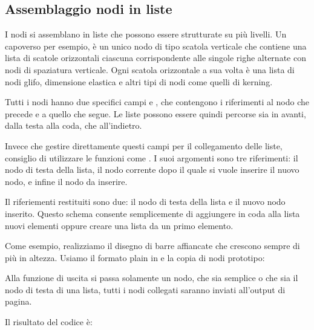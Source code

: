 \subsection{Assemblaggio nodi in liste}

I nodi si assemblano in liste che possono essere strutturate su più livelli. Un
capoverso per esempio, è un unico nodo di tipo scatola verticale che contiene
una lista di scatole orizzontali ciascuna corrispondente alle singole righe
alternate con nodi di spaziatura verticale. Ogni scatola orizzontale a sua volta
è una lista di nodi glifo, dimensione elastica e altri tipi di nodi come quelli
di kerning.

Tutti i nodi hanno due specifici campi  e , che contengono
i riferimenti al nodo che precede e a quello che segue. Le liste possono essere
quindi percorse sia in avanti, dalla testa alla coda, che all'indietro.

Invece che gestire direttamente questi campi per il collegamento delle liste,
consiglio di utilizzare le funzioni come
. I suoi argomenti sono tre
riferimenti: il nodo di testa della lista, il nodo corrente dopo il quale si
vuole inserire il nuovo nodo, e infine il nodo da inserire.

Il riferiementi restituiti sono due: il nodo di testa della lista e il nuovo
nodo inserito. Questo schema consente semplicemente di aggiungere in coda alla
lista nuovi elementi oppure creare una lista da un primo elemento.

Come esempio, realizziamo il disegno di barre affiancate che crescono sempre di
più in altezza. Usiamo il formato plain in \LuaTeX{} e la copia di nodi
prototipo:

Alla funzione di uscita  si passa solamente un nodo, che sia
semplice o che sia il nodo di testa di una lista, tutti i nodi collegati saranno
inviati all'output di pagina.

Il risultato del codice è: 


